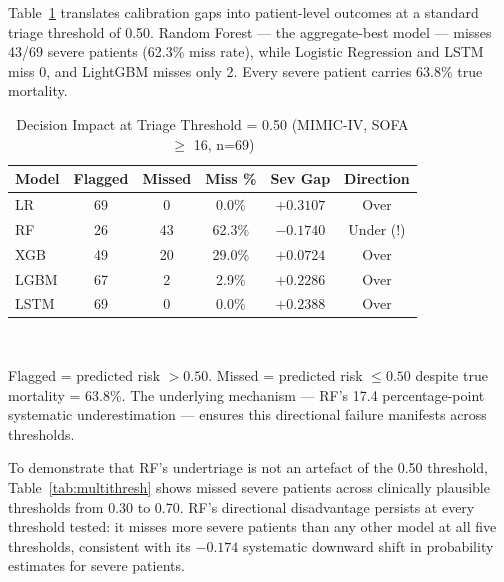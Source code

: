 \documentclass{ieeeaccess}
\begin{document}
Table~\ref{tab:decision} translates calibration gaps into patient-level outcomes at a standard triage threshold of 0.50. Random Forest — the aggregate-best model — misses 43/69 severe patients (62.3\% miss rate), while Logistic Regression and LSTM miss 0, and LightGBM misses only 2. Every severe patient carries 63.8\% true mortality.

\begin{table}[t!]
\caption{Decision Impact at Triage Threshold = 0.50 (MIMIC-IV, SOFA $\ge$ 16, n=69)}
\label{tab:decision}
\centering
\footnotesize
\setlength{\tabcolsep}{2.5pt}
\begin{tabularx}{\columnwidth}{@{}lccccc@{}}
\toprule
\textbf{Model} & \textbf{Flagged} & \textbf{Missed} & \textbf{Miss \%} & \textbf{Sev Gap} & \textbf{Direction} \\
\midrule
LR   & 69 &  0 &  0.0\% & $+0.3107$ & Over \\
RF   & 26 & 43 & 62.3\% & $-0.1740$ & Under (!) \\
XGB  & 49 & 20 & 29.0\% & $+0.0724$ & Over \\
LGBM & 67 &  2 &  2.9\% & $+0.2286$ & Over \\
LSTM & 69 &  0 &  0.0\% & $+0.2388$ & Over \\
\bottomrule
\end{tabularx}
\\[4pt]
\parbox{\columnwidth}{\footnotesize Flagged = predicted risk $> 0.50$. Missed = predicted risk $\le 0.50$ despite true mortality = 63.8\%. The underlying mechanism — RF's 17.4 percentage-point systematic underestimation — ensures this directional failure manifests across thresholds.}
\end{table}

To demonstrate that RF's undertriage is not an artefact of the 0.50 threshold, Table~\ref{tab:multithresh} shows missed severe patients across clinically plausible thresholds from 0.30 to 0.70. RF's directional disadvantage persists at every threshold tested: it misses more severe patients than any other model at all five thresholds, consistent with its $-0.174$ systematic downward shift in probability estimates for severe patients.
\end{document}
